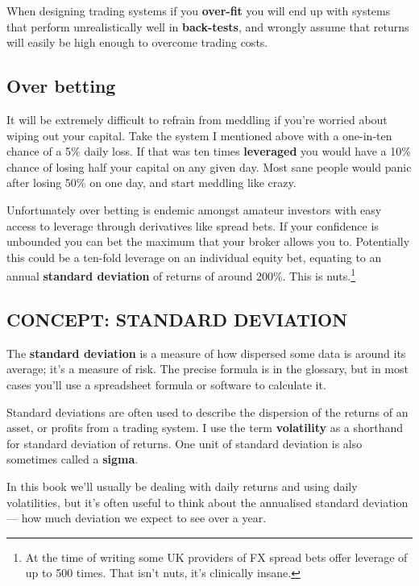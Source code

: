 When designing trading systems if you \textbf{over-fit} you will end up with systems that perform unrealistically well in \textbf{back-tests}, and wrongly assume that returns will easily be high enough to overcome trading costs.

\subsection*{Over betting}

It will be extremely difficult to refrain from meddling if you're worried about wiping out your capital. Take the system I mentioned above with a one-in-ten chance of a 5\% daily loss. If that was ten times \textbf{leveraged} you would have a 10\% chance of losing half your capital on any given day. Most sane people would panic after losing 50\% on one day, and start meddling like crazy.

Unfortunately over betting is endemic amongst amateur investors with easy access to leverage through derivatives like spread bets. If your confidence is unbounded you can bet the maximum that your broker allows you to. Potentially this could be a ten-fold leverage on an individual equity bet, equating to an annual \textbf{standard deviation} of returns of around 200\%. This is nuts.\footnote{At the time of writing some UK providers of FX spread bets offer leverage of up to 500 times. That isn't nuts, it's clinically insane.}

\subsection*{CONCEPT: STANDARD DEVIATION}

The \textbf{standard deviation} is a measure of how dispersed some data is around its average; it's a measure of risk. The precise formula is in the glossary, but in most cases you'll use a spreadsheet formula or software to calculate it.

Standard deviations are often used to describe the dispersion of the returns of an asset, or profits from a trading system. I use the term \textbf{volatility} as a shorthand for standard deviation of returns. One unit of standard deviation is also sometimes called a \textbf{sigma}.

In this book we'll usually be dealing with daily returns and using daily volatilities, but it's often useful to think about the annualised standard deviation --- how much deviation we expect to see over a year.

